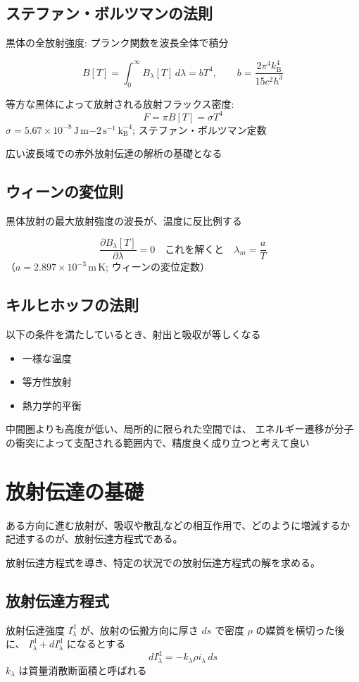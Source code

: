 \documentclass[article,nontitlepage,]{dennou777}
\newcommand{\Unit}[1]{\,\mathrm{#1}}
\begin{document}
\subsection{ステファン・ボルツマンの法則}
黒体の全放射強度: プランク関数を波長全体で積分

\[B[T]=\int^\infty_0 B_\lambda[T]\,d\lambda=bT^4, \qquad b=\frac{2\pi^4k_\mathrm{B}^4}{15c^2h^3}\]

等方な黒体によって放射される放射フラックス密度: \[F=\pi B[T]=\sigma T^4\]
$\sigma=5.67\times10^{-8}\Unit{J\,m{-2}\,s^{-1}\,k_\mathrm{B}^{-4}}$; ステファン・ボルツマン定数

広い波長域での赤外放射伝達の解析の基礎となる

\subsection{ウィーンの変位則}
黒体放射の最大放射強度の波長が、温度に反比例する

\[\frac{\partial B_\lambda[T]}{\partial\lambda}=0\quad\text{これを解くと}\quad\lambda_m=\frac{a}{T}\]
（$a=2.897\times10^{-3}\Unit{m\,K}$; ウィーンの変位定数）

\subsection{キルヒホッフの法則}
以下の条件を満たしているとき、射出と吸収が等しくなる

\begin{itemize}
	\item 一様な温度
	\item 等方性放射
	\item 熱力学的平衡
\end{itemize}

中間圏よりも高度が低い、局所的に限られた空間では、
エネルギー遷移が分子の衝突によって支配される範囲内で、精度良く成り立つと考えて良い

\section{放射伝達の基礎}
ある方向に進む放射が、吸収や散乱などの相互作用で、どのように増減するか
記述するのが、放射伝達方程式である。

放射伝達方程式を導き、特定の状況での放射伝達方程式の解を求める。

\subsection{放射伝達方程式}
放射伝達強度 $I_\lambda^\mathrm{d}$ が、放射の伝搬方向に厚さ $ds$ で密度 $\rho$ の媒質を横切った後に、
$I_\lambda^\mathrm{d}+dI_\lambda^\mathrm{d}$ になるとする
\[dI_\lambda^\mathrm{d}=-k_\lambda\rho i_\lambda\,ds\]
$k_\lambda$ は質量消散断面積と呼ばれる
\end{document}
